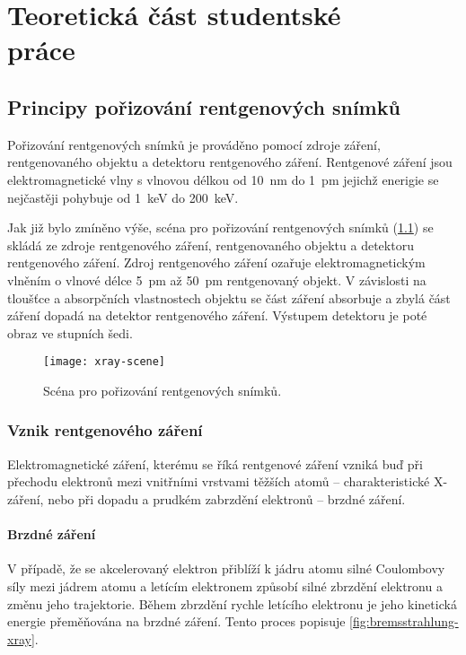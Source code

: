 \chapter[Teoretická část studentské práce]{Teoretická část studentské\\ práce}

\section{Principy pořizování rentgenových snímků}
\label{sec:principy}
Pořizování rentgenových snímků je prováděno pomocí zdroje záření, rentgenovaného objektu a detektoru rentgenového záření. Rentgenové záření jsou elektromagnetické vlny s vlnovou délkou od \SI{10}{\nano\meter} do \SI{1}{\pico\meter} jejichž enerigie se nejčastěji pohybuje od \SI{1}{\kilo\eV} do \SI{200}{\kilo\eV}. \cite{AstroNuklFyzika-JadRadFyzika}

Jak již bylo zmíněno výše, scéna pro pořizování rentgenových snímků (\cref{fig:xray-scene}) se skládá ze zdroje rentgenového záření, rentgenovaného objektu a detektoru rentgenového záření. Zdroj rentgenového záření ozařuje elektromagnetickým vlněním o vlnové délce \SI{5}{\pico\meter} až \SI{50}{\pico\meter} rentgenovaný objekt. V závislosti na tloušťce a absorpčních vlastnostech objektu se část záření absorbuje a zbylá část záření dopadá na detektor rentgenového záření. Výstupem detektoru je poté obraz ve stupních šedi. \cite[kap.~3.2]{AstroNuklFyzika-JadRadMetody}

\begin{figure}[bh]
\texttt{[image: xray-scene]}
\caption{Scéna pro pořizování rentgenových snímků.}
\label{fig:xray-scene}
\centering
\end{figure}

\subsection{Vznik rentgenového záření}
\label{sec:vznik-rentgenoveho-zareni}
Elektromagnetické záření, kterému se říká rentgenové záření vzniká buď při přechodu elektronů mezi vnitřními vrstvami těžších atomů -- charakteristické X-záření, nebo při dopadu a prudkém zabrzdění elektronů -- brzdné záření. \cite{AstroNuklFyzika-JadRadFyzika}

\subsubsection{Brzdné záření}
V případě, že se akcelerovaný elektron přiblíží k jádru atomu silné Coulombovy síly mezi jádrem atomu a letícím elektronem způsobí silné zbrzdění elektronu a změnu jeho trajektorie. Během zbrzdění rychle letícího elektronu  je jeho kinetická energie přeměňována na brzdné záření. \cite[str.~89]{Diagnostic-Radiology-Physics} Tento proces popisuje \cref{fig:bremsstrahlung-xray}.

